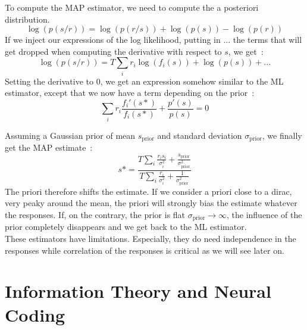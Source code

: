 \documentclass[10pt,a4paper]{article}
\begin{document}
To compute the MAP estimator, we need to compute the a posteriori
distribution.\\
\begin{equation}
\log(p(s/r)) = \log(p(r/s)) + \log(p(s)) - \log(p(r))
\end{equation}
If we inject our expressions of the log likelihood, putting in $...$
the terms that will get dropped when computing the derivative with
respect to $s$, we get~:
\begin{equation}
\log(p(s/r)) = T \sum_i r_i \log(f_i(s)) + \log(p(s)) + ...
\end{equation}
Setting the derivative to $0$, we get an expression somehow similar to
the ML estimator, except that we now have a term depending on the
prior~:
\begin{equation}
\sum_i r_i \frac{f_i'(s*)}{f_i(s*)} + \frac{p'(s)}{p(s)} = 0
\end{equation}

Assuming a Gaussian prior of mean $s_{\mbox{prior}}$ and standard
deviation $\sigma_{\mbox{prior}}$, we finally get the MAP estimate~:
\begin{equation}
s* = \frac{T \sum_i \frac{r_i s_i}{\sigma_i^2} +
  \frac{s_{\mbox{prior}}}{\sigma_{\mbox{prior}}^2}}{T\sum_i
  \frac{r_i}{\sigma_i^2} + \frac{1}{\sigma_{\mbox{prior}}^2}}
\end{equation}
The priori therefore shifts the estimate. If we consider a priori
close to a dirac, very peaky around the mean, the priori will strongly
bias the estimate whatever the responses. If, on the contrary, the
prior is flat $\sigma_{\mbox{prior}} \rightarrow \infty$, the
influence of the prior completely disappears and we get back to the ML
estimator.\\

These estimators have limitations. Especially, they do need
independence in the responses while correlation of the responses is
critical as we will see later on.

\section{Information Theory and Neural Coding}
\end{document}
